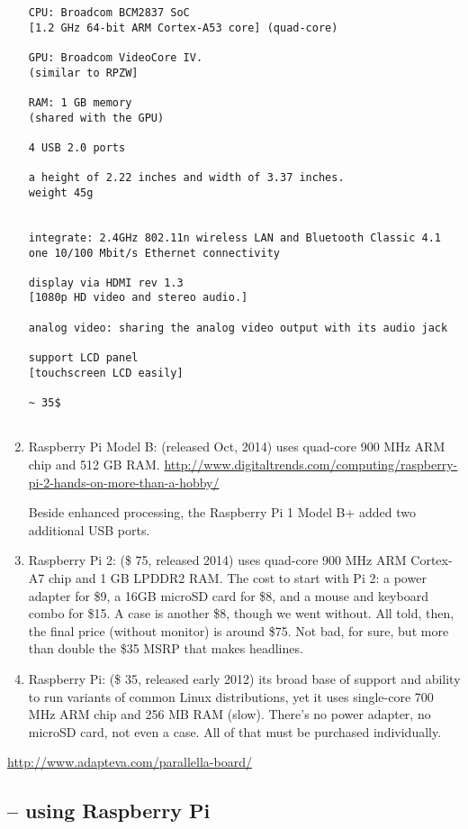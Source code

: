 \begin{enumerate}
\begin{verbatim}
CPU: Broadcom BCM2837 SoC
[1.2 GHz 64-bit ARM Cortex-A53 core] (quad-core)

GPU: Broadcom VideoCore IV.
(similar to RPZW]

RAM: 1 GB memory 
(shared with the GPU)

4 USB 2.0 ports

a height of 2.22 inches and width of 3.37 inches.
weight 45g


integrate: 2.4GHz 802.11n wireless LAN and Bluetooth Classic 4.1
one 10/100 Mbit/s Ethernet connectivity

display via HDMI rev 1.3
[1080p HD video and stereo audio.]

analog video: sharing the analog video output with its audio jack

support LCD panel
[touchscreen LCD easily]

~ 35$


\end{verbatim}  
  
  \item Raspberry Pi Model B: (released Oct, 2014) uses quad-core 900 MHz ARM chip and
512 GB RAM.
\url{http://www.digitaltrends.com/computing/raspberry-pi-2-hands-on-more-than-a-hobby/}

Beside enhanced processing, the Raspberry Pi 1 Model B+ added two additional USB ports.  


  \item Raspberry Pi 2: (\$ 75, released 2014) uses quad-core 900 MHz ARM Cortex-A7
chip and 1 GB LPDDR2 RAM. The cost to start with Pi 2: a power adapter for \$9,
a 16GB microSD card for \$8, and a mouse and keyboard combo for \$15. A case is another \$8, though we went without. All
told, then, the final price (without monitor) is around \$75. Not bad, for sure,
but more than double the \$35 MSRP that makes headlines.


  \item Raspberry Pi: (\$ 35, released early 2012)
its broad base of support and ability to run variants of common Linux
distributions, yet it uses single-core 700 MHz ARM chip and 256 MB RAM (slow).
There's no power adapter, no microSD card, not even a case. All of that must be purchased individually.


\end{enumerate}


\url{http://www.adapteva.com/parallella-board/}

\subsection{-- using Raspberry Pi}


